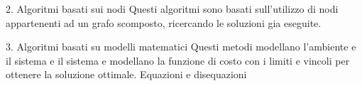 \begin{idee}
	2. Algoritmi basati sui nodi
		Questi algoritmi sono basati sull'utilizzo di nodi appartenenti ad un grafo scomposto, ricercando le soluzioni gia eseguite.
		
	3. Algoritmi basati su modelli matematici
		Questi metodi modellano l'ambiente  e il sistema e il sistema e modellano la funzione di costo con i limiti e vincoli per ottenere la soluzione ottimale. Equazioni e disequazioni
		
	
	
\end{idee}